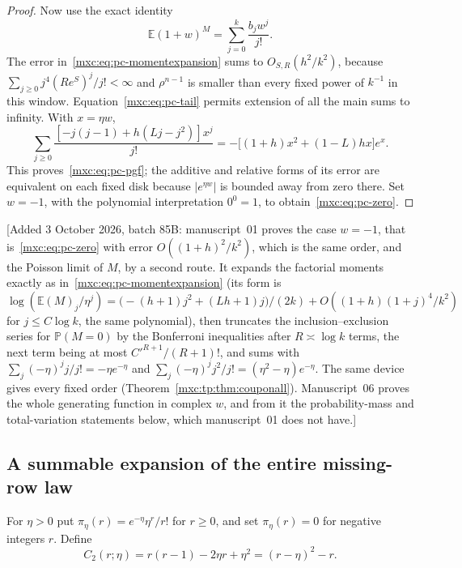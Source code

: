 \documentclass[11pt]{article}
\numberwithin{equation}{section}
\theoremstyle{definition}
\theoremstyle{remark}
\newcommand{\E}{\mathbb E}
\newcommand{\Pp}{\mathbb P}
\begin{document}
\begin{proof}
Now use the exact identity
\[
 \mathbb E(1+w)^M=\sum_{j=0}^k\frac{b_jw^j}{j!}.
\]
The error in~\eqref{mxc:eq:pc-momentexpansion} sums to $O_{S,R}(h^2/k^2)$,
because $\sum_{j\geq0}j^4(R e^S)^j/j!<\infty$ and
$\rho^{n-1}$ is smaller than every fixed power of $k^{-1}$ in this
window.  Equation~\eqref{mxc:eq:pc-tail} permits extension of all the
main sums to infinity.  With $x=\eta w$,
\[
 \sum_{j\geq0}
 \frac{[-j(j-1)+h(Lj-j^2)]x^j}{j!}
 =-\bigl[(1+h)x^2+(1-L)hx\bigr]e^x.
\]
This proves~\eqref{mxc:eq:pc-pgf}; the additive and relative forms of its
error are equivalent on each fixed disk because $|e^{\eta w}|$
is bounded away from zero there.  Set $w=-1$, with the polynomial
interpretation $0^0=1$, to obtain~\eqref{mxc:eq:pc-zero}.
\end{proof}

[Added 3 October 2026, batch 85B: manuscript~01 proves the case $w=-1$,
that is~\eqref{mxc:eq:pc-zero} with error $O((1+h)^2/k^2)$, which is the
same order, and the Poisson limit of $M$, by a second route. It expands
the factorial moments exactly as in~\eqref{mxc:eq:pc-momentexpansion}
(its form is
$\log(\E(M)_j/\eta^j)=\bigl(-(h+1)j^2+(Lh+1)j\bigr)/(2k)
+O((1+h)(1+j)^4/k^2)$ for $j\le C\log k$, the same polynomial), then
truncates the inclusion--exclusion series for $\Pp(M=0)$ by the Bonferroni
inequalities after $R\asymp\log k$ terms, the next term being at most
$C'^{R+1}/(R+1)!$, and sums with
$\sum_j(-\eta)^jj/j!=-\eta e^{-\eta}$ and
$\sum_j(-\eta)^jj^2/j!=(\eta^2-\eta)e^{-\eta}$. The same device gives
every fixed order (Theorem~\ref{mxc:tp:thm:couponall}). Manuscript~06 proves the
whole generating function in complex $w$, and from it the probability-mass
and total-variation statements below, which manuscript~01 does not have.]

\subsection{A summable expansion of the entire missing-row law}

For $\eta>0$ put $\pi_\eta(r)=e^{-\eta}\eta^r/r!$
for $r\geq0$, and set $\pi_\eta(r)=0$ for negative integers $r$.
Define
\[
 C_2(r;\eta)=r(r-1)-2\eta r+\eta^2
 =(r-\eta)^2-r.
\]
\end{document}
